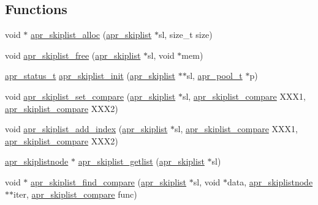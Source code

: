 \subsection*{Functions}
\begin{DoxyCompactItemize}
\item 
void $\ast$ \hyperlink{group__apr__skiplist_ga42fd4de5a4239c988c3d57f88bd685d6}{apr\-\_\-skiplist\-\_\-alloc} (\hyperlink{group__apr__skiplist_gac79ddf14bb5cb5b6d35961309eadec48}{apr\-\_\-skiplist} $\ast$sl, size\-\_\-t size)
\item 
void \hyperlink{group__apr__skiplist_ga9e799684f45cc8a1b673cc99ca935f2b}{apr\-\_\-skiplist\-\_\-free} (\hyperlink{group__apr__skiplist_gac79ddf14bb5cb5b6d35961309eadec48}{apr\-\_\-skiplist} $\ast$sl, void $\ast$mem)
\item 
\hyperlink{group__apr__errno_gaf76ee4543247e9fb3f3546203e590a6c}{apr\-\_\-status\-\_\-t} \hyperlink{group__apr__skiplist_ga53f636612f9d82ef2886a85d33c704ed}{apr\-\_\-skiplist\-\_\-init} (\hyperlink{group__apr__skiplist_gac79ddf14bb5cb5b6d35961309eadec48}{apr\-\_\-skiplist} $\ast$$\ast$sl, \hyperlink{group__apr__pools_gaf137f28edcf9a086cd6bc36c20d7cdfb}{apr\-\_\-pool\-\_\-t} $\ast$p)
\item 
void \hyperlink{group__apr__skiplist_ga61bebe90df16a4ea8a6ab6c6b6792e4a}{apr\-\_\-skiplist\-\_\-set\-\_\-compare} (\hyperlink{group__apr__skiplist_gac79ddf14bb5cb5b6d35961309eadec48}{apr\-\_\-skiplist} $\ast$sl, \hyperlink{group__apr__skiplist_ga4e5bca4c34a9932deee61c3ac4ed7d4a}{apr\-\_\-skiplist\-\_\-compare} X\-X\-X1, \hyperlink{group__apr__skiplist_ga4e5bca4c34a9932deee61c3ac4ed7d4a}{apr\-\_\-skiplist\-\_\-compare} X\-X\-X2)
\item 
void \hyperlink{group__apr__skiplist_ga7f9e8bd8d1900d64c82ca5c9113621a8}{apr\-\_\-skiplist\-\_\-add\-\_\-index} (\hyperlink{group__apr__skiplist_gac79ddf14bb5cb5b6d35961309eadec48}{apr\-\_\-skiplist} $\ast$sl, \hyperlink{group__apr__skiplist_ga4e5bca4c34a9932deee61c3ac4ed7d4a}{apr\-\_\-skiplist\-\_\-compare} X\-X\-X1, \hyperlink{group__apr__skiplist_ga4e5bca4c34a9932deee61c3ac4ed7d4a}{apr\-\_\-skiplist\-\_\-compare} X\-X\-X2)
\item 
\hyperlink{group__apr__skiplist_gafb934f577d03de823aa4d62b41399bc0}{apr\-\_\-skiplistnode} $\ast$ \hyperlink{group__apr__skiplist_ga2a4515bc1a4174fde279c2edc5dd2593}{apr\-\_\-skiplist\-\_\-getlist} (\hyperlink{group__apr__skiplist_gac79ddf14bb5cb5b6d35961309eadec48}{apr\-\_\-skiplist} $\ast$sl)
\item 
void $\ast$ \hyperlink{group__apr__skiplist_gac1dc196aa51b1370cdc41e6258c36d7c}{apr\-\_\-skiplist\-\_\-find\-\_\-compare} (\hyperlink{group__apr__skiplist_gac79ddf14bb5cb5b6d35961309eadec48}{apr\-\_\-skiplist} $\ast$sl, void $\ast$data, \hyperlink{group__apr__skiplist_gafb934f577d03de823aa4d62b41399bc0}{apr\-\_\-skiplistnode} $\ast$$\ast$iter, \hyperlink{group__apr__skiplist_ga4e5bca4c34a9932deee61c3ac4ed7d4a}{apr\-\_\-skiplist\-\_\-compare} func)

\end{DoxyCompactItemize}
